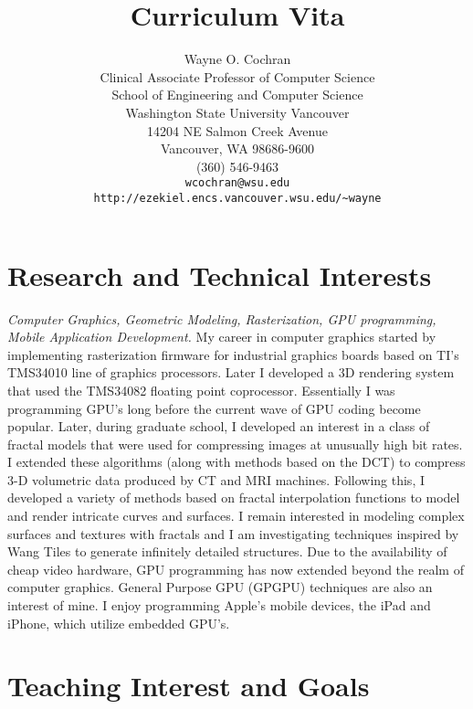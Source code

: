 \documentclass[10pt]{article}
\title{Curriculum Vita}
\author{Wayne O. Cochran\\
       Clinical Associate Professor of Computer Science\\
       School of Engineering and Computer Science\\
       Washington State University Vancouver\\
       14204 NE Salmon Creek Avenue\\
       Vancouver, WA 98686-9600\\
       (360) 546-9463\\
       {\tt wcochran@wsu.edu} \\
       {\tt http://ezekiel.encs.vancouver.wsu.edu/\~{}wayne}}
\begin{document}
\maketitle




\section*{Research and Technical Interests}

{\em Computer Graphics, Geometric Modeling, Rasterization, 
GPU programming, Mobile Application Development.}
My career in computer graphics started by 
implementing rasterization firmware
for industrial graphics boards based on
TI's TMS34010 line of graphics processors.
Later I developed a 3D rendering system
that used the TMS34082 floating  point coprocessor.
Essentially I was programming GPU's long before
the current wave of GPU coding become popular.
Later, during graduate school, I developed an interest
in a class of fractal models that were used for compressing
images at unusually high bit rates. I extended these
algorithms (along with methods based on the DCT)
to compress 3-D volumetric data produced by CT
and MRI machines. Following this, I developed a variety of methods
based on fractal interpolation functions to model
and render intricate curves and surfaces.
I remain interested in modeling 
complex surfaces and textures with fractals and I am
investigating techniques inspired by
Wang Tiles to generate infinitely detailed structures.
Due to the availability of cheap video hardware,
GPU programming
has now extended beyond the realm of computer graphics.
General Purpose GPU (GPGPU) techniques are also
an interest of mine.
I enjoy programming Apple's mobile devices, the iPad and iPhone,
which utilize embedded GPU's.

\section*{Teaching Interest and Goals}
\end{document}
